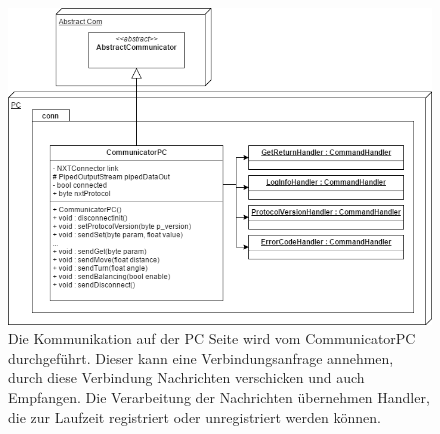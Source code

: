 \documentclass[oneside,abstractoff,a4paper]{scrartcl}
\begin{document}
\begin{figure}
	\includegraphics[width=\textwidth,height=\textheight,keepaspectratio]{ConnPC.png}
    \caption{Die Kommunikation auf der PC Seite wird vom CommunicatorPC durchgeführt. Dieser kann eine Verbindungsanfrage annehmen, durch diese Verbindung Nachrichten verschicken und auch Empfangen. Die Verarbeitung der Nachrichten übernehmen Handler, die zur Laufzeit registriert oder unregistriert werden können.}
    \label{fig:ConnPC}
\end{figure}
\end{document}
